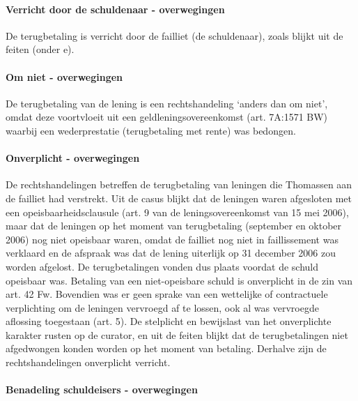 \documentclass[
  dutch,
  a4paper,
]{article}
\begin{document}
\paragraph{Verricht door de schuldenaar - overwegingen}\label{verricht-door-de-schuldenaar---overwegingen-72}

De terugbetaling is verricht door de failliet (de schuldenaar), zoals blijkt uit de feiten (onder e).

\paragraph{Om niet - overwegingen}\label{om-niet---overwegingen-72}

De terugbetaling van de lening is een rechtshandeling `anders dan om niet', omdat deze voortvloeit uit een geldleningsovereenkomst (art. 7A:1571 BW) waarbij een wederprestatie (terugbetaling met rente) was bedongen.

\paragraph{Onverplicht - overwegingen}\label{onverplicht---overwegingen-72}

De rechtshandelingen betreffen de terugbetaling van leningen die Thomassen aan de failliet had verstrekt. Uit de casus blijkt dat de leningen waren afgesloten met een opeisbaarheidsclausule (art. 9 van de leningsovereenkomst van 15 mei 2006), maar dat de leningen op het moment van terugbetaling (september en oktober 2006) nog niet opeisbaar waren, omdat de failliet nog niet in faillissement was verklaard en de afspraak was dat de lening uiterlijk op 31 december 2006 zou worden afgelost. De terugbetalingen vonden dus plaats voordat de schuld opeisbaar was. Betaling van een niet-opeisbare schuld is onverplicht in de zin van art. 42 Fw. Bovendien was er geen sprake van een wettelijke of contractuele verplichting om de leningen vervroegd af te lossen, ook al was vervroegde aflossing toegestaan (art. 5). De stelplicht en bewijslast van het onverplichte karakter rusten op de curator, en uit de feiten blijkt dat de terugbetalingen niet afgedwongen konden worden op het moment van betaling. Derhalve zijn de rechtshandelingen onverplicht verricht.

\paragraph{Benadeling schuldeisers - overwegingen}\label{benadeling-schuldeisers---overwegingen-72}
\end{document}
